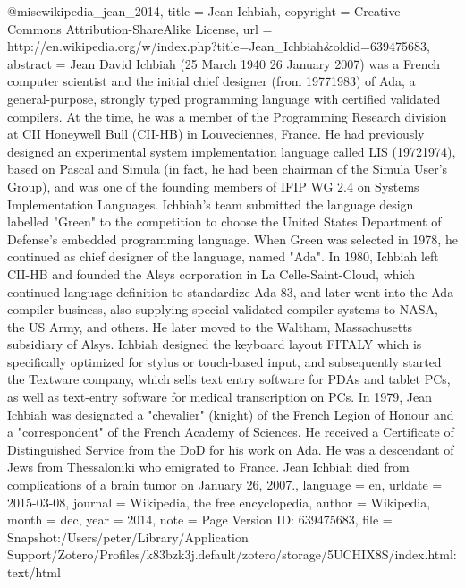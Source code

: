 {@misc{wikipedia_jean_2014,
	title = {Jean {Ichbiah}},
	copyright = {Creative Commons Attribution-ShareAlike License},
	url = {http://en.wikipedia.org/w/index.php?title=Jean_Ichbiah&oldid=639475683},
	abstract = {Jean David Ichbiah (25 March 1940 {\textendash} 26 January 2007) was a French computer scientist and the initial chief designer (from 1977{\textendash}1983) of Ada, a general-purpose, strongly typed programming language with certified validated compilers. At the time, he was a member of the Programming Research division at CII Honeywell Bull (CII-HB) in Louveciennes, France. He had previously designed an experimental system implementation language called LIS (1972{\textendash}1974), based on Pascal and Simula (in fact, he had been chairman of the Simula User's Group), and was one of the founding members of IFIP WG 2.4 on Systems Implementation Languages.
Ichbiah's team submitted the language design labelled "Green" to the competition to choose the United States Department of Defense's embedded programming language. When Green was selected in 1978, he continued as chief designer of the language, named "Ada". In 1980, Ichbiah left CII-HB and founded the Alsys corporation in La Celle-Saint-Cloud, which continued language definition to standardize Ada 83, and later went into the Ada compiler business, also supplying special validated compiler systems to NASA, the US Army, and others. He later moved to the Waltham, Massachusetts subsidiary of Alsys.
Ichbiah designed the keyboard layout FITALY which is specifically optimized for stylus or touch-based input, and subsequently started the Textware company, which sells text entry software for PDAs and tablet PCs, as well as text-entry software for medical transcription on PCs.
In 1979, Jean Ichbiah was designated a "chevalier" (knight) of the French Legion of Honour and a "correspondent" of the French Academy of Sciences. He received a Certificate of Distinguished Service from the DoD for his work on Ada.
He was a descendant of Jews from Thessaloniki who emigrated to France. Jean Ichbiah died from complications of a brain tumor on January 26, 2007.},
	language = {en},
	urldate = {2015-03-08},
	journal = {Wikipedia, the free encyclopedia},
	author = {{Wikipedia}},
	month = dec,
	year = {2014},
	note = {Page Version ID: 639475683},
	file = {Snapshot:/Users/peter/Library/Application Support/Zotero/Profiles/k83bzk3j.default/zotero/storage/5UCHIX8S/index.html:text/html}
}

}
